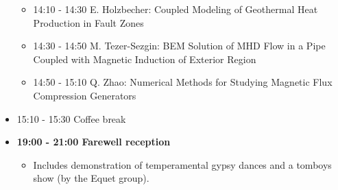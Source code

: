\documentclass[10pt, A4]{article}%
\begin{document}
\begin{itemize}
\begin{itemize}
    \item 14:10 - 14:30 E. Holzbecher: Coupled Modeling of Geothermal Heat Production in Fault Zones 
    \item 14:30 - 14:50 M. Tezer-Sezgin: BEM Solution of MHD Flow in a Pipe Coupled with Magnetic Induction of Exterior Region 
    \item 14:50 - 15:10 Q. Zhao: Numerical Methods for Studying Magnetic Flux Compression Generators 
  \end{itemize}
  \item 15:10 - 15:30 Coffee break
  \item {\bf 19:00 - 21:00 Farewell reception}
    \begin{itemize}
     \item Includes demonstration of temperamental gypsy dances and a tomboys show (by the Equet group).
  \end{itemize} 
\end{itemize}

\newpage
\end{document}
